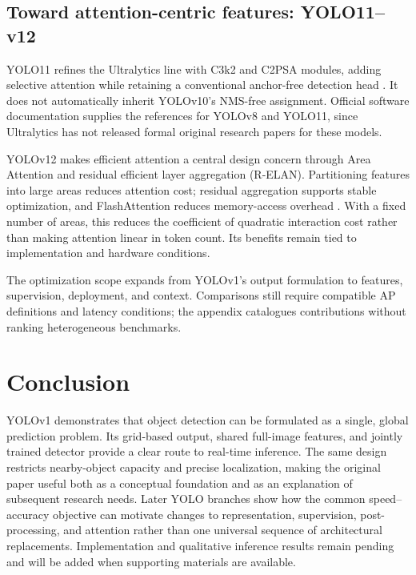 \documentclass[11pt,a4paper]{article}
\begin{document}
\subsection{Toward attention-centric features: YOLO11--v12}
YOLO11 refines the Ultralytics line with C3k2 and C2PSA modules, adding selective attention while retaining a conventional anchor-free detection head \cite{ultralytics2024yolo11,ultralyticscode}. It does not automatically inherit YOLOv10's NMS-free assignment. Official software documentation supplies the references for YOLOv8 and YOLO11, since Ultralytics has not released formal original research papers for these models.

YOLOv12 makes efficient attention a central design concern through Area Attention and residual efficient layer aggregation (R-ELAN). Partitioning features into large areas reduces attention cost; residual aggregation supports stable optimization, and FlashAttention reduces memory-access overhead \cite{tian2025yolov12}. With a fixed number of areas, this reduces the coefficient of quadratic interaction cost rather than making attention linear in token count. Its benefits remain tied to implementation and hardware conditions.

The optimization scope expands from YOLOv1's output formulation to features, supervision, deployment, and context. Comparisons still require compatible AP definitions and latency conditions; the appendix catalogues contributions without ranking heterogeneous benchmarks.

\FloatBarrier
\section{Conclusion}
YOLOv1 demonstrates that object detection can be formulated as a single, global prediction problem. Its grid-based output, shared full-image features, and jointly trained detector provide a clear route to real-time inference. The same design restricts nearby-object capacity and precise localization, making the original paper useful both as a conceptual foundation and as an explanation of subsequent research needs. Later YOLO branches show how the common speed--accuracy objective can motivate changes to representation, supervision, post-processing, and attention rather than one universal sequence of architectural replacements. Implementation and qualitative inference results remain pending and will be added when supporting materials are available.
\end{document}
